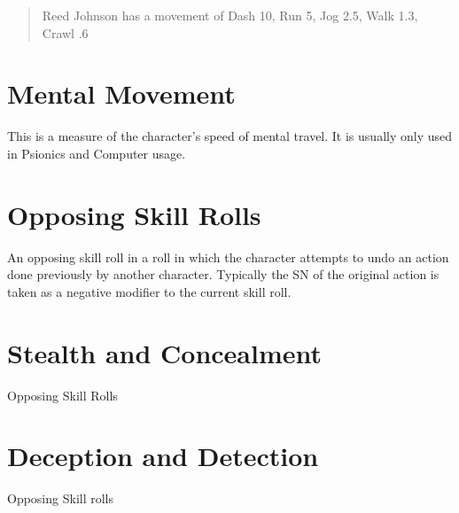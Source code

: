 \begin{quotation}
Reed Johnson has a movement of Dash 10, Run 5, Jog 2.5, Walk 1.3, Crawl .6
\end{quotation}



\section{Mental Movement}
This is a measure of the character's speed of mental travel. It is 
usually only used in Psionics and Computer usage.

\section{Opposing Skill Rolls}

An opposing skill roll in a roll in which the character attempts to 
undo an action done previously by another character. Typically the SN 
of the original action is taken as a negative modifier to the current 
skill roll.

\section{Stealth and Concealment}

Opposing Skill Rolls

\section{Deception and Detection}

Opposing Skill rolls



